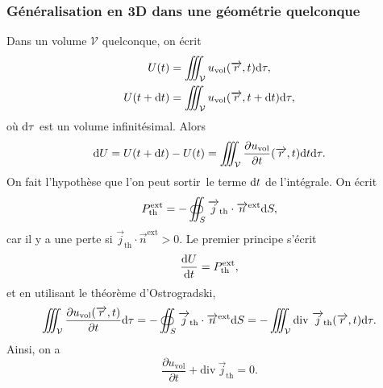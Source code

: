         \subsubsection{Généralisation en 3D dans une géométrie quelconque}
            
            Dans un volume $\mathcal{V}$ quelconque, on écrit
            \begin{equation}
                \begin{aligned}
                    U(t)&=\iiint_{\mathcal{V}}u_{\text{vol}}(\protect\overrightarrow{{r}},t)\mathrm{d}\tau,\\
                    U(t+\mathrm{d} t)&=\iiint_{\mathcal{V}}u_{\text{vol}}(\protect\overrightarrow{{r}},t+\mathrm{d} t)\mathrm{d}\tau,\\
                \end{aligned}
            \end{equation}
            où $\mathrm{d}\tau$ est un volume infinitésimal. Alors
            \begin{equation}
                \mathrm{d} U=U(t+\mathrm{d} t)-U(t)=\iiint_{\mathcal{V}}\frac{\partial u_{\text{vol}}}{\partial t}(\protect\overrightarrow{{r}},t)\mathrm{d} t\mathrm{d}\tau.
            \end{equation}
            On fait l'hypothèse que l'on peut \og sortir\fg~le terme $\mathrm{d} t$ de l'intégrale. On écrit
            \begin{equation}
                P_{\text{th}}^{\text{ext}}=-\oiint_{S}\protect\overrightarrow{{j}}_{\text{th}}\cdot\protect\overrightarrow{{n}}^{\text{ext}}\mathrm{d} S,
            \end{equation}
            car il y a une perte si $\vec{j}_{\text{th}}\cdot\vec{n}^{\text{ext}}>0$. Le premier principe s'écrit 
            \begin{equation}
                \frac{\mathrm{d} U}{\mathrm{d} t}=P_{\text{th}}^{\text{ext}},
            \end{equation}
            et en utilisant le théorème d'Ostrogradski,
            \begin{equation}
                \iiint_{\mathcal{V}}\frac{\partial u_{\text{vol}}(\protect\overrightarrow{{r}},t)}{\partial t}\mathrm{d}\tau=-\oiint_{S}\protect\overrightarrow{{j}}_{\text{th}}\cdot\protect\overrightarrow{{n}}^{\text{ext}}\mathrm{d} S=-\iiint_{\mathcal{V}}\mathrm{div}~\protect\overrightarrow{{j}}_{\text{th}}(\protect\overrightarrow{{r}},t)\mathrm{d}\tau.
            \end{equation}
            Ainsi, on a 
            \begin{equation}
                \boxed{
                    \frac{\partial u_{\text{vol}}}{\partial t}+\mathrm{div}~\vec{j}_{\text{th}}=0.
                }
            \end{equation}

